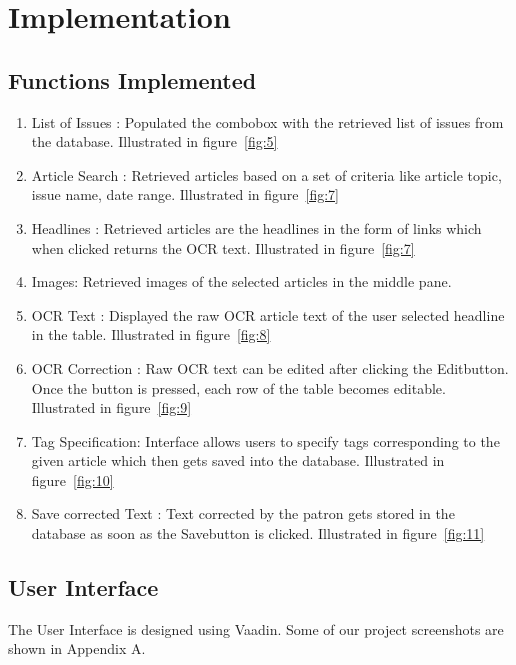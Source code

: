 \documentclass[12pt]{article}
\begin{document}
\section{Implementation}
\label{sec:implementation}
\subsection{Functions Implemented}
\begin{enumerate}
\item List of Issues : Populated the combobox with the retrieved list of issues from the database. Illustrated in figure~\ref{fig:5}
\item Article Search : Retrieved articles based on a set of criteria like article topic, issue name, date range. Illustrated in figure~\ref{fig:7}
\item Headlines : Retrieved articles are the headlines in the form of links which when clicked returns the OCR text. Illustrated in figure~\ref{fig:7}
\item Images: Retrieved images of the selected articles in the middle pane.
\item OCR Text : Displayed the raw OCR article text of the user selected headline in the table. Illustrated in figure~\ref{fig:8}
\item OCR Correction  : Raw OCR text can be edited after clicking the \textgravedbl Edit\textasciidieresis button. Once the button is pressed, each row of the table becomes editable. Illustrated in figure~\ref{fig:9}
\item Tag Specification: Interface allows users to specify tags corresponding to the given article which then gets saved into the database. Illustrated in figure~\ref{fig:10}
\item Save corrected Text : Text corrected by the patron gets stored in the database as soon as the \textgravedbl Save\textasciidieresis button is clicked. Illustrated in figure~\ref{fig:11}
\end{enumerate}
	
\subsection{User Interface}
The User Interface is designed using Vaadin. Some of our project screenshots are shown in Appendix A.
\end{document}

